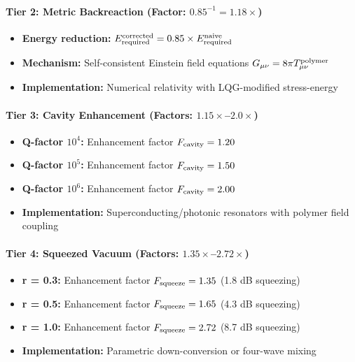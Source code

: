 \documentclass[11pt]{article}
\begin{document}
{\paragraph{Tier 2: Metric Backreaction (Factor: $0.85^{-1} = 1.18\times$)}
\begin{itemize}
  \item \textbf{Energy reduction:} $E_{\rm required}^{\rm corrected} = 0.85 \times E_{\rm required}^{\rm naive}$
  \item \textbf{Mechanism:} Self-consistent Einstein field equations $G_{\mu\nu} = 8\pi T_{\mu\nu}^{\rm polymer}$
  \item \textbf{Implementation:} Numerical relativity with LQG-modified stress-energy
\end{itemize}

\paragraph{Tier 3: Cavity Enhancement (Factors: $1.15\times$--$2.0\times$)}
\begin{itemize}
  \item \textbf{Q-factor $10^4$:} Enhancement factor $F_{\rm cavity} = 1.20$
  \item \textbf{Q-factor $10^5$:} Enhancement factor $F_{\rm cavity} = 1.50$  
  \item \textbf{Q-factor $10^6$:} Enhancement factor $F_{\rm cavity} = 2.00$
  \item \textbf{Implementation:} Superconducting/photonic resonators with polymer field coupling
\end{itemize}

\paragraph{Tier 4: Squeezed Vacuum (Factors: $1.35\times$--$2.72\times$)}
\begin{itemize}
  \item \textbf{r = 0.3:} Enhancement factor $F_{\rm squeeze} = 1.35$ (1.8 dB squeezing)
  \item \textbf{r = 0.5:} Enhancement factor $F_{\rm squeeze} = 1.65$ (4.3 dB squeezing)
  \item \textbf{r = 1.0:} Enhancement factor $F_{\rm squeeze} = 2.72$ (8.7 dB squeezing)
  \item \textbf{Implementation:} Parametric down-conversion or four-wave mixing
\end{itemize}

}
\end{document}
